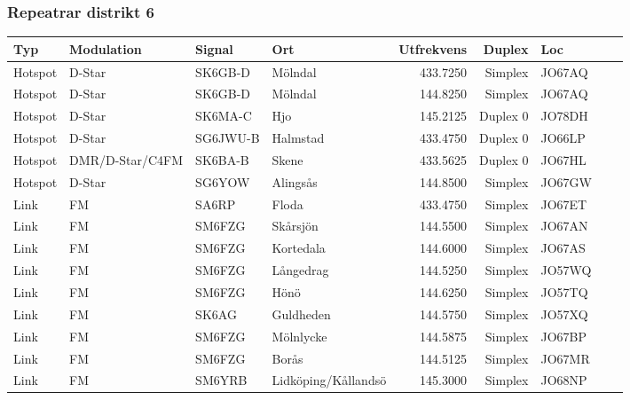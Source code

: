 \subsubsection{Repeatrar distrikt 6}

\begin{longtable}{llllrrlcl}
	Typ      & Modulation      & Signal   & Ort                   & Utfrekvens &   Duplex & Loc    &  &  \\ \hline
	Hotspot  & D-Star          & SK6GB-D  & Mölndal               &   433.7250 &  Simplex & JO67AQ &  &  \\
	Hotspot  & D-Star          & SK6GB-D  & Mölndal               &   144.8250 &  Simplex & JO67AQ &  &  \\
	Hotspot  & D-Star          & SK6MA-C  & Hjo                   &   145.2125 & Duplex 0 & JO78DH &  &  \\
	Hotspot  & D-Star          & SG6JWU-B & Halmstad              &   433.4750 & Duplex 0 & JO66LP &  &  \\
	Hotspot  & DMR/D-Star/C4FM & SK6BA-B  & Skene                 &   433.5625 & Duplex 0 & JO67HL &  &  \\
	Hotspot  & D-Star          & SG6YOW   & Alingsås              &   144.8500 &  Simplex & JO67GW &  &  \\
	Link     & FM              & SA6RP    & Floda                 &   433.4750 &  Simplex & JO67ET &  &  \\
	Link     & FM              & SM6FZG   & Skårsjön              &   144.5500 &  Simplex & JO67AN &  &  \\
	Link     & FM              & SM6FZG   & Kortedala             &   144.6000 &  Simplex & JO67AS &  &  \\
	Link     & FM              & SM6FZG   & Långedrag             &   144.5250 &  Simplex & JO57WQ &  &  \\
	Link     & FM              & SM6FZG   & Hönö                  &   144.6250 &  Simplex & JO57TQ &  &  \\
	Link     & FM              & SK6AG    & Guldheden             &   144.5750 &  Simplex & JO57XQ &  &  \\
	Link     & FM              & SM6FZG   & Mölnlycke             &   144.5875 &  Simplex & JO67BP &  &  \\
	Link     & FM              & SM6FZG   & Borås                 &   144.5125 &  Simplex & JO67MR &  &  \\
	Link     & FM              & SM6YRB   & Lidköping/Kållandsö   &   145.3000 &  Simplex & JO68NP &  &  \\

\end{longtable}
